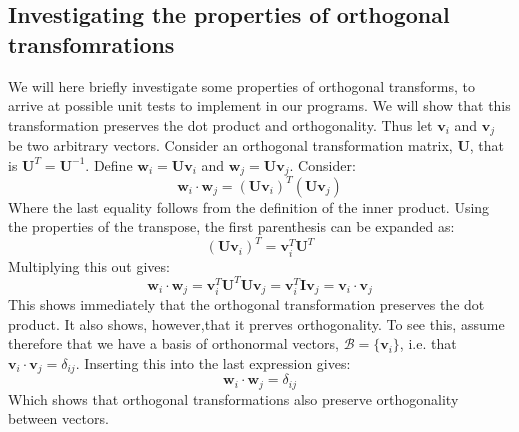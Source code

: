 \documentclass[a4paper, 10pt]{article}
\begin{document}
\subsection{Investigating the properties of orthogonal transfomrations}
We will here briefly investigate some properties of orthogonal transforms, to arrive at possible unit tests to implement in our programs. 
We will show that this transformation preserves the dot product and orthogonality. Thus let $\mathbf{v}_i$ and $\mathbf{v}_j$ be two arbitrary vectors. Consider an orthogonal transformation matrix, $\mathbf{U}$, that is $\mathbf{U}^T=\mathbf{U}^{-1}$. Define $\mathbf{w}_i=\mathbf{U}\mathbf{v}_i$ and $\mathbf{w}_j=\mathbf{U}\mathbf{v}_j$. Consider:
$$\mathbf{w}_i \cdot \mathbf{w}_j=\left(\mathbf{U}\mathbf{v}_i\right)^T\left(\mathbf{U}\mathbf{v}_j\right)$$
Where the last equality follows from the definition of the inner product. Using the properties of the transpose, the first parenthesis can be expanded as:
$$\left(\mathbf{U}\mathbf{v}_i\right)^T = \mathbf{v}_i^T\mathbf{U}^T$$
Multiplying this out gives:
$$\mathbf{w}_i\cdot \mathbf{w}_j=\mathbf{v}_i^T\mathbf{U}^T\mathbf{U}\mathbf{v}_j=
\mathbf{v}_i^T\mathbf{I}\mathbf{v}_j=\mathbf{v}_i\cdot \mathbf{v}_j$$
This shows immediately that the orthogonal transformation preserves the dot product. It also shows, however,that it prerves orthogonality. To see this, assume therefore that we have a basis of orthonormal vectors, $\mathcal{B}=\{\mathbf{v}_i\}$, i.e. that $\mathbf{v}_i\cdot \mathbf{v}_j=\delta_{ij}$. Inserting this into the last expression gives:
$$\mathbf{w}_i\cdot \mathbf{w}_j=\delta_{ij}$$
Which shows that orthogonal transformations also preserve orthogonality between vectors.
\end{document}

